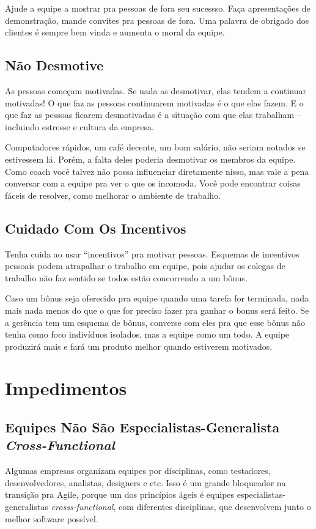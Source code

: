 \documentclass[a4paper, 10pt, font=plain]{abnt}
\begin{document}
Ajude a equipe a mostrar pra pessoas de fora seu sucessso. Faça apresentações de demonstração, mande convites pra pessoas de fora. Uma palavra de obrigado dos clientes é sempre bem vinda e aumenta o moral da equipe.


\subsection{Não Desmotive}
As pessoas começam motivadas. Se nada as desmotivar, elas tendem a continuar motivadas! O que faz as pessoas continuarem motivadas é o que elas fazem. E o que faz as pessoas ficarem desmotivadas é a situação com que elas trabalham -- incluindo estresse e cultura da empresa.

Computadores rápidos, um café decente, um bom salário, não seriam notados se estivessem lá. Porém, a falta deles poderia desmotivar os membros da equipe. Como coach você talvez não possa influenciar diretamente nisso, mas vale a pena conversar com a equipe pra ver o que os incomoda. Você pode encontrar coisas fáceis de resolver, como melhorar o ambiente de trabalho.


\subsection{Cuidado Com Os Incentivos}
Tenha cuida ao usar ``incentivos'' pra motivar pessoas. Esquemas de incentivos pessoais podem atrapalhar o trabalho em equipe, pois ajudar os colegas de trabalho não faz sentido se todos estão concorrendo a um bônus.

Caso um bônus seja oferecido pra equipe quando uma tarefa for terminada, nada mais nada menos do que o que for preciso fazer pra ganhar o bonus será feito. Se a gerência tem um esquema de bônus, converse com eles pra que esse bônus não tenha como foco indivíduos isolados, mas a equipe como um todo. A equipe produzirá mais e fará um produto melhor quando estiverem motivados.



\section{Impedimentos}

\subsection{Equipes Não São Especialistas-Generalista \textit{Cross-Functional}}
Algumas empresas organizam equipes por disciplinas, como testadores, desenvolvedores, analistas, designers e etc. Isso é um grande bloqueador na transição pra Agile, porque um dos princípios ágeis é equipes especialistas-generalistas \textit{crosss-functional}, com diferentes disciplinas, que desenvolvem junto o melhor software possível.
\end{document}
